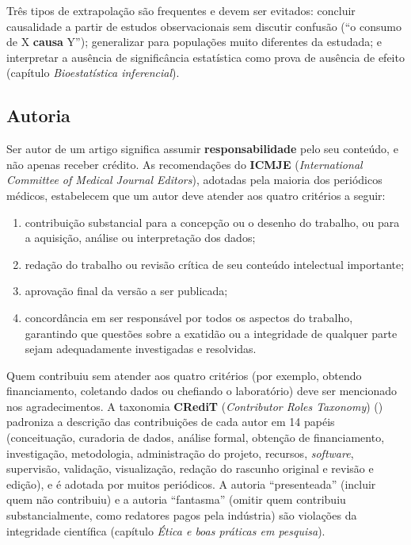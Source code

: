 \documentclass[
]{book}
\providecommand{\tightlist}{%
  \setlength{\itemsep}{0pt}\setlength{\parskip}{0pt}}
\begin{document}
Três tipos de extrapolação são frequentes e devem ser evitados: concluir causalidade a partir de estudos observacionais sem discutir confusão (``o consumo de X \textbf{causa} Y''); generalizar para populações muito diferentes da estudada; e interpretar a ausência de significância estatística como prova de ausência de efeito (capítulo \emph{Bioestatística inferencial}).

\subsection{Autoria}\label{autoria}

Ser autor de um artigo significa assumir \textbf{responsabilidade} pelo seu conteúdo, e não apenas receber crédito. As recomendações do \textbf{ICMJE} (\emph{International Committee of Medical Journal Editors}), adotadas pela maioria dos periódicos médicos, estabelecem que um autor deve atender aos quatro critérios a seguir:

\begin{enumerate}
\def\labelenumi{\arabic{enumi}.}
\tightlist
\item
  contribuição substancial para a concepção ou o desenho do trabalho, ou para a aquisição, análise ou interpretação dos dados;
\item
  redação do trabalho ou revisão crítica de seu conteúdo intelectual importante;
\item
  aprovação final da versão a ser publicada;
\item
  concordância em ser responsável por todos os aspectos do trabalho, garantindo que questões sobre a exatidão ou a integridade de qualquer parte sejam adequadamente investigadas e resolvidas.
\end{enumerate}

Quem contribuiu sem atender aos quatro critérios (por exemplo, obtendo financiamento, coletando dados ou chefiando o laboratório) deve ser mencionado nos agradecimentos. A taxonomia \textbf{CRediT} (\emph{Contributor Roles Taxonomy}) () padroniza a descrição das contribuições de cada autor em 14 papéis (conceituação, curadoria de dados, análise formal, obtenção de financiamento, investigação, metodologia, administração do projeto, recursos, \emph{software}, supervisão, validação, visualização, redação do rascunho original e revisão e edição), e é adotada por muitos periódicos. A autoria ``presenteada'' (incluir quem não contribuiu) e a autoria ``fantasma'' (omitir quem contribuiu substancialmente, como redatores pagos pela indústria) são violações da integridade científica (capítulo \emph{Ética e boas práticas em pesquisa}).
\end{document}
